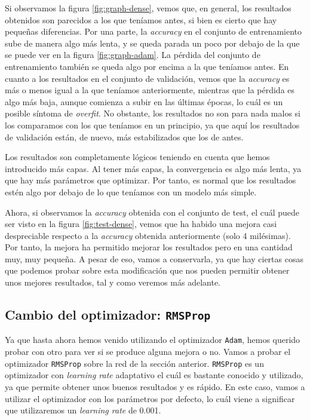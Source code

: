 \documentclass[11pt,a4paper]{article}
\begin{document}
Si observamos la figura \ref{fig:graph-dense}, vemos que, en general, los resultados obtenidos son parecidos a los que
teníamos antes, si bien es cierto que hay pequeñas diferencias. Por una parte, la \textit{accuracy} en el conjunto de
entrenamiento sube de manera algo más lenta, y se queda parada un poco por debajo de la que se puede ver
en la figura \ref{fig:graph-adam}. La pérdida del conjunto de entrenamiento también se queda algo por encima
a la que teníamos antes. En cuanto a los resultados en el conjunto de validación, vemos que la \textit{accuracy}
es más o menos igual a la que teníamos anteriormente, mientras que la pérdida es algo más baja, aunque comienza a subir
en las últimas épocas, lo cuál es un posible síntoma de \textit{overfit}. No obstante, los resultados no son para
nada malos si los comparamos con los que teníamos en un principio, ya que aquí los resultados de validación están,
de nuevo, más estabilizados que los de antes.

Los resultados son completamente lógicos teniendo en cuenta que hemos introducido más capas. Al tener más capas,
la convergencia es algo más lenta, ya que hay más parámetros que optimizar. Por tanto, es normal que los resultados
estén algo por debajo de lo que teníamos con un modelo más simple.

Ahora, si observamos la \textit{accuracy} obtenida con el conjunto de test, el cuál puede ser visto en la figura
\ref{fig:test-dense}, vemos que ha habido una mejora casi despreciable respecto a la \textit{accuracy} obtenida
anteriormente (solo 4 milésimas). Por tanto, la mejora ha permitido mejorar los resultados pero en una
cantidad muy, muy pequeña. A pesar de eso, vamos a conservarla, ya que hay ciertas cosas que podemos probar sobre
esta modificación que nos pueden permitir obtener unos mejores resultados, tal y como veremos más adelante.

\subsection{Cambio del optimizador: \texttt{RMSProp}}

Ya que hasta ahora hemos venido utilizando el optimizador \texttt{Adam}, hemos querido probar con otro para
ver si se produce alguna mejora o no. Vamos a probar el optimizador \texttt{RMSProp} sobre la red de la sección
anterior. \texttt{RMSProp} es un optimizador con \textit{learning rate} adaptativo el cuál es bastante conocido y
utilizado, ya que permite obtener unos buenos resultados y es rápido. En este caso, vamos a utilizar el optimizador
con los parámetros por defecto, lo cuál viene a significar que utilizaremos un \textit{learning rate} de 0.001.
\end{document}
